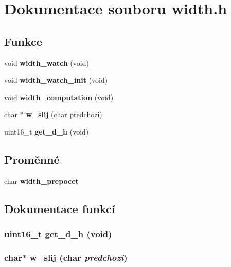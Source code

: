 \section{Dokumentace souboru width.h}
\label{width_8h}
\subsection*{Funkce}
\begin{CompactItemize}
\item 
void {\bf width\_\-watch} (void)
\item 
void {\bf width\_\-watch\_\-init} (void)
\item 
void {\bf width\_\-computation} (void)
\item 
char $\ast$ {\bf w\_\-slij} (char predchozi)
\item 
uint16\_\-t {\bf get\_\-d\_\-h} (void)
\end{CompactItemize}
\subsection*{Proměnné}
\begin{CompactItemize}
\item 
char {\bf width\_\-prepocet}
\end{CompactItemize}


\subsection{Dokumentace funkcí}
\subsubsection{\setlength{\rightskip}{0pt plus 5cm}uint16\_\-t get\_\-d\_\-h (void)}\label{width_8h_dc5e5de00526ee21858f22fd7d721b29}


\subsubsection{\setlength{\rightskip}{0pt plus 5cm}char$\ast$ w\_\-slij (char {\em predchozi})}\label{width_8h_af961853a28e76b018b378a52af84708}


